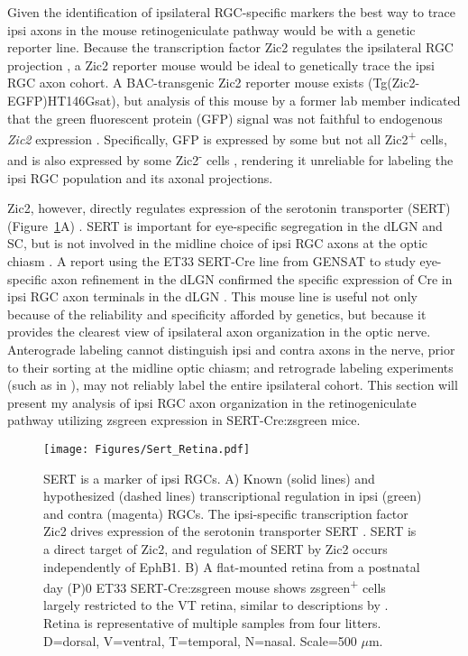 \label{sec:SertCreResults}
Given the identification of ipsilateral RGC-specific markers the best way to trace ipsi axons in the mouse retinogeniculate pathway would be with a genetic reporter line.
Because the transcription factor Zic2 regulates the ipsilateral RGC projection \cite{herrera2003zic2,williams2003ephrin}, a Zic2 reporter mouse would be ideal to genetically trace the ipsi RGC axon cohort.
A BAC-transgenic Zic2 reporter mouse exists (Tg(Zic2-EGFP)HT146Gsat), but analysis of this mouse by a former lab member indicated that the green fluorescent protein (GFP) signal was not faithful to endogenous \emph{Zic2} expression \cite{wang2013neuronal,marcucci2016ciliary}.
Specifically, GFP is expressed by some but not all Zic2\textsuperscript{+} cells, and is also expressed by some Zic2\textsuperscript{-} cells \cite{wang2013neuronal}, rendering it unreliable for labeling the ipsi RGC population and its axonal projections.

Zic2, however, directly regulates expression of the serotonin transporter (SERT) (Figure~\ref{Figures/SertRetina}A) \cite{garcia2010zic2}.
SERT is important for eye-specific segregation in the dLGN and SC, but is not involved in the midline choice of ipsi RGC axons at the optic chiasm \cite{upton1999excess,salichon2001excessive,garcia2010zic2}.
A report using the ET33 SERT-Cre line from GENSAT to study eye-specific axon refinement in the dLGN confirmed the specific expression of Cre in ipsi RGC axon terminals in the dLGN \cite{koch2011pathway}.
This mouse line is useful not only because of the reliability and specificity afforded by genetics, but because it provides the clearest view of ipsilateral axon organization in the optic nerve.
Anterograde labeling cannot distinguish ipsi and contra axons in the nerve, prior to their sorting at the midline optic chiasm; and retrograde labeling experiments (such as in ), may not reliably label the entire ipsilateral cohort.
This section will present my analysis of ipsi RGC axon organization in the retinogeniculate pathway utilizing zsgreen expression in SERT-Cre:zsgreen mice.

\begin{figure}[hbtp]
    \begin{center}
        \texttt{[image: Figures/Sert\_Retina.pdf]}
        \caption[SERT is a marker of ipsi RGCs.]
        {SERT is a marker of ipsi RGCs.
        A) Known (solid lines) and hypothesized (dashed lines) transcriptional regulation in ipsi (green) and contra (magenta) RGCs.
        The ipsi-specific transcription factor Zic2 drives expression of the serotonin transporter SERT \cite{garcia2010zic2}.
        SERT is a direct target of Zic2, and regulation of SERT by Zic2 occurs independently of EphB1.
        B) A flat-mounted retina from a postnatal day (P)0 ET33 SERT-Cre:zsgreen mouse shows zsgreen\textsuperscript{+} cells largely restricted to the VT retina, similar to descriptions by .
		Retina is representative of multiple samples from four litters.
        D=dorsal, V=ventral, T=temporal, N=nasal.
        Scale=500 $\mu$m.}
        \label{Figures/SertRetina}
    \end{center}
\end{figure}

